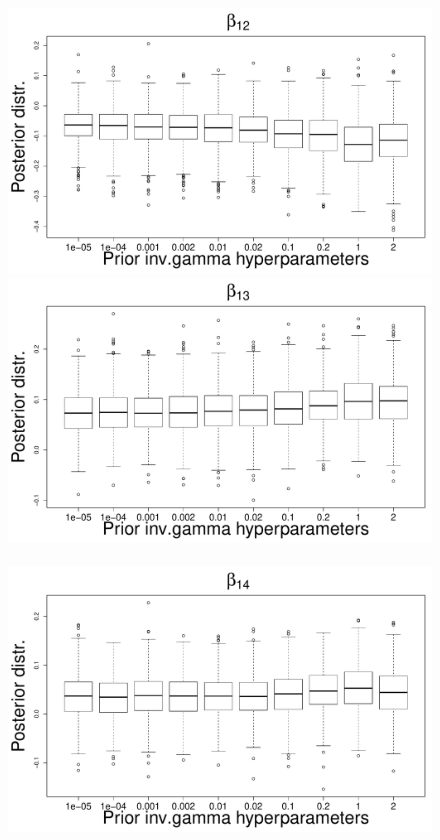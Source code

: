 \documentclass{statsoc}
\begin{document}
\begin{figure}
\includegraphics[scale=0.25]{Sensitivity/beta_12_sensitivity.pdf}\\
\includegraphics[scale=0.25]{Sensitivity/beta_13_sensitivity.pdf}~
\includegraphics[scale=0.25]{Sensitivity/beta_14_sensitivity.pdf}\\

\end{figure}
\end{document}
